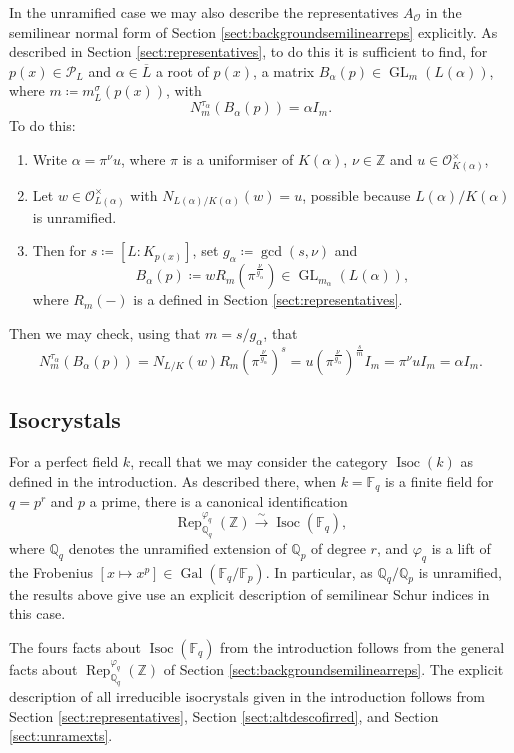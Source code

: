 \documentclass[10pt, reqno, hidelinks]{amsart}
\newcommand{\OO}{\mathcal{O}}
\DeclareMathOperator{\Isoc}{Isoc}
\DeclareMathOperator{\Gal}{Gal}
\DeclareMathOperator{\Rep}{Rep}
\DeclareMathOperator{\GL}{GL}
\newcommand{\bF}{{\mathbb F}}
\newcommand{\bQ}{{\mathbb Q}}
\newcommand{\bZ}{{\mathbb Z}}
\newcommand{\sP}{{\mathcal P}}
\numberwithin{thm}{subsection}
\theoremstyle{definition}
\begin{document}
In the unramified case we may also describe the representatives $A_{\OO}$ in the semilinear normal form of Section \ref{sect:backgroundsemilinearreps} explicitly. As described in Section \ref{sect:representatives}, to do this it is sufficient to find, for $p(x) \in \sP_L$ and $\alpha \in \overline{L}$ a root of $p(x)$, a matrix $B_{\alpha}(p) \in \GL_m(L(\alpha))$, where $m \coloneqq m_L^{\sigma}(p(x))$, with 
\[
N^{\tau_{\alpha}}_m(B_{\alpha}(p)) = \alpha I_m.
\]
To do this: 
\begin{enumerate}
	\item Write $\alpha = \pi^{\nu} u$, where $\pi$ is a uniformiser of $K(\alpha)$, $\nu \in \bZ$ and $u \in \OO_{K(\alpha)}^{\times}$,
	\item Let $w \in \OO_{L(\alpha)}^{\times}$ with $N_{L(\alpha) / K(\alpha)}(w) = u$, possible because $L(\alpha) / K(\alpha)$ is unramified.
	\item Then for $s \coloneqq [L : K_{p(x)}]$, set $g_{\alpha} \coloneqq \gcd(s,\nu)$ and
\[
B_{\alpha}(p) \coloneqq w R_m(\pi^{\frac{\nu}{g_{\alpha}}}) \in \GL_{m_{\alpha}}(L(\alpha)),
\]
where $R_m(-)$ is a defined in Section \ref{sect:representatives}.
\end{enumerate}

Then we may check, using that $m = s / g_{\alpha}$, that 
\[
N^{\tau_{\alpha}}_m(B_{\alpha}(p)) = N_{L/K}(w) R_m(\pi^{\frac{\nu}{g_{\alpha}}})^{s} = u (\pi^{\frac{\nu}{g_{\alpha}}})^{\frac{s}{m}} I_m = \pi^{\nu} u I_m = \alpha I_m.
\]

\subsection{Isocrystals}\label{sect:isocrystals}

For a perfect field $k$, recall that we may consider the category $\Isoc(k)$ as defined in the introduction. As described there, when $k = \bF_q$ is a finite field for $q = p^r$ and $p$ a prime, there is a canonical identification 
\[
\Rep_{\bQ_q}^{\varphi_q}(\bZ) \xrightarrow{\sim} \Isoc(\bF_q),
\]
where $\bQ_q$ denotes the unramified extension of $\bQ_p$ of degree $r$, and $\varphi_q$ is a lift of the Frobenius $[x \mapsto x^p] \in \Gal(\bF_q / \bF_p)$. In particular, as $\bQ_q / \bQ_p$ is unramified, the results above give use an explicit description of semilinear Schur indices in this case.

The fours facts about $\Isoc(\bF_q)$ from the introduction follows from the general facts about $\Rep_{\bQ_q}^{\varphi_q}(\bZ)$ of Section \ref{sect:backgroundsemilinearreps}. The explicit description of all irreducible isocrystals given in the introduction follows from Section \ref{sect:representatives}, Section \ref{sect:altdescofirred}, and Section \ref{sect:unramexts}. 
\end{document}
